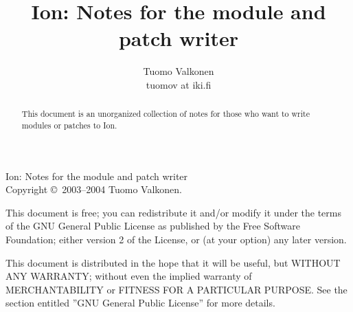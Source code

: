 \documentclass[english,a4paper,11pt,oldtoc,mctitle]{artikel3}
\title{Ion: Notes for the module and patch writer}
\author{Tuomo Valkonen \\ tuomov at iki.fi}
\begin{document}
\maketitle

Ion: Notes for the module and patch writer\\
Copyright \copyright\  2003--2004 Tuomo Valkonen.

This document is free; you can redistribute it and/or modify
it under the terms of the GNU General Public License as published by
the Free Software Foundation; either version 2 of the License, or
(at your option) any later version.

This document is distributed in the hope that it will be useful,
but WITHOUT ANY WARRANTY; without even the implied warranty of
MERCHANTABILITY or FITNESS FOR A PARTICULAR PURPOSE.  See the
section entitled ''GNU General Public License'' for more details.

\bigskip

\begin{abstract}
    This document is an unorganized collection of notes for
    those who want to write modules or patches to Ion.
\end{abstract}

\tableofcontents











\appendix



\printindex
\end{document}
